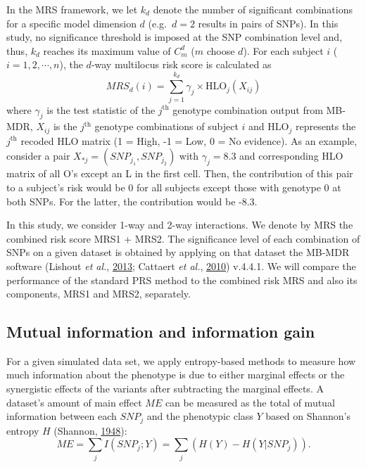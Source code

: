 \documentclass[a4paper,twoside, 9pt]{article}
\begin{document}
In the MRS framework, we let \(k_d\) denote the number of significant
combinations for a specific model dimension \(d\) (e.g.~\(d = 2\)
results in pairs of SNPs). In this study, no significance threshold is
imposed at the SNP combination level and, thus, \(k_d\) reaches its
maximum value of \(C^d_m\) (\(m\) choose \(d\)). For each subject \(i\)
(\(i = 1,2, \dotsm, n\)), the \(d\)-way multilocus risk score is
calculated as
\begin{equation}\label{eq2}
MRS_d(i) = \sum_{j = 1}^{k_d} \gamma_j \times \textrm{HLO}_j(X_{ij})
\end{equation}
where \(\gamma_j\) is the test statistic of the \(j^\textrm{th}\)
genotype combination output from MB-MDR, \(X_{ij}\) is the
\(j^\textrm{th}\) genotype combinations of subject \(i\) and
\(\textrm{HLO}_j\) represents the \(j^\textrm{th}\) recoded HLO matrix
(1 = High, -1 = Low, 0 = No evidence). As an example, consider a pair
\(X_{*j} = (SNP_{j_1}, SNP_{j_2})\) with \(\gamma_j=8.3\) and
corresponding HLO matrix of all O's except an L in the first cell.
Then, the contribution of this pair to a subject's risk would be 0 for all subjects except those with genotype 0 at both SNPs.
For the latter, the contribution would be -8.3.

In this study, we consider 1-way and 2-way interactions. We denote by
MRS the combined risk score MRS1 + MRS2. The significance level of each
combination of SNPs on a given dataset is obtained by applying on that
dataset the MB-MDR software (Lishout \emph{et al.},
\protect\hyperlink{ref-S6nj6BFK}{2013}; Cattaert \emph{et al.},
\protect\hyperlink{ref-16AnEAMje}{2010}) v.4.4.1. We will compare the
performance of the standard PRS method to the combined risk MRS and also
its components, MRS1 and MRS2, separately.

\subsection{Mutual information and information
gain}\label{mutual-information-and-information-gain}

\noindent For a given simulated data set, we apply entropy-based methods to
measure how much information about the phenotype is due to either
marginal effects or the synergistic effects of the variants after
subtracting the marginal effects. A dataset's amount of main effect
\(ME\) can be measured as the total of mutual information between each
\(SNP_j\) and the phenotypic class \(Y\) based on Shannon's
entropy \(H\) (Shannon, \protect\hyperlink{ref-yzGboP1g}{1948}):
\begin{equation}\label{eq3}
ME = \sum_{j} I(SNP_j; Y) = \sum_{j} \left(H(Y) - H(Y|SNP_j)\right).
\end{equation}
\end{document}
